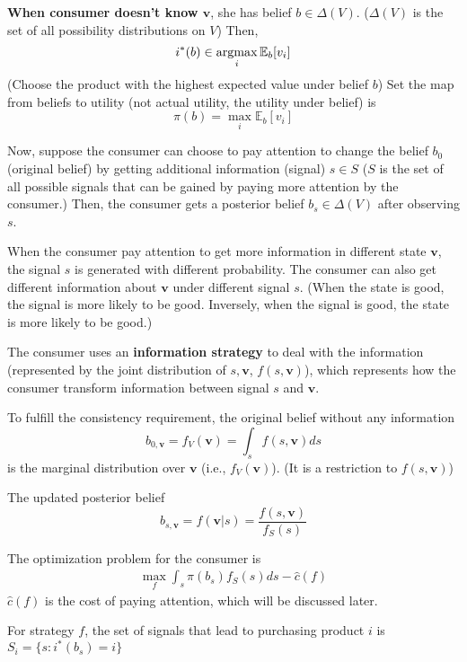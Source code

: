 \documentclass[11pt,a4paper]{article}
\newcommand{\argmax}{\operatornamewithlimits{argmax}}
\begin{document}
\textbf{When consumer doesn't know $\mathbf{v}$}, she has belief $b\in \Delta(V)$. ($\Delta(V)$ is the set of all possibility distributions on $V$) Then, $$i^*(b)\in \argmax_i  \mathbb{E}_b[v_i]$$ (Choose the product with the highest expected value under belief $b$) Set the map from beliefs to utility (not actual utility, the utility under belief) is $$\pi(b)=\max_i\mathbb{E}_b[v_i]$$

Now, suppose the consumer can choose to pay attention to change the belief $b_0$(original belief) by getting additional information (signal) $s\in S$ ($S$ is the set of all possible signals that can be gained by paying more attention by the consumer.) Then, the consumer gets a posterior belief $b_s\in \Delta(V)$ after observing $s$.

When the consumer pay attention to get more information in different state $\mathbf{v}$, the signal $s$ is generated with different probability. The consumer can also get different information about $\mathbf{v}$ under different signal $s$. (When the state is good, the signal is more likely to be good. Inversely, when the signal is good, the state is more likely to be good.)

The consumer uses an \textbf{information strategy} to deal with the information (represented by the joint distribution of $s,\mathbf{v}$, $f(s,\mathbf{v})$), which represents how the consumer transform information between signal $s$ and $\mathbf{v}$.

To fulfill the consistency requirement, the original belief without any information $$b_{0,\mathbf{v}}=f_V(\mathbf{v})=\int_sf(s,\mathbf{v})ds$$ is the marginal distribution over $\mathbf{v}$ (i.e., $f_V(\mathbf{v})$). (It is a restriction to $f(s,\mathbf{v})$)

The updated posterior belief $$b_{s,\mathbf{v}}=f(\mathbf{v}|s)=\frac{f(s,\mathbf{v})}{f_S(s)}$$

The optimization problem for the consumer is
\begin{equation}
    \begin{aligned}
        \max_{f}\int_s \pi(b_s)f_S(s)ds-\hat{c}(f)
    \end{aligned}
    \nonumber
\end{equation}
$\hat{c}(f)$ is the cost of paying attention, which will be discussed later.

For strategy $f$, the set of signals that lead to purchasing product $i$ is $S_i=\{s:i^*(b_s)=i\}$
\end{document}
